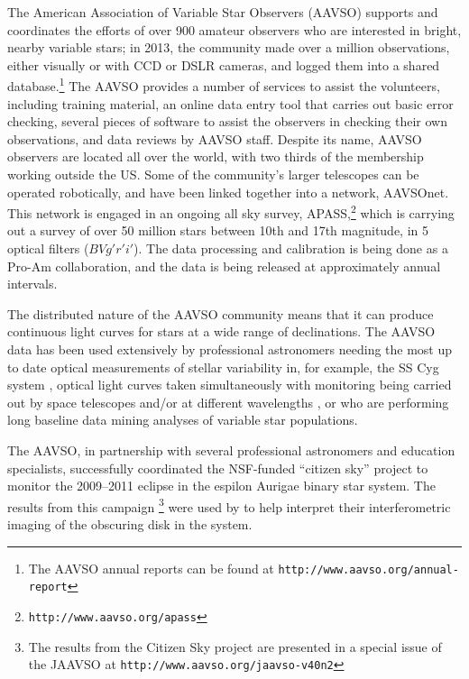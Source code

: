 \documentclass{ar2e}
\def\eg{{\it e.g.}\xspace}
\def\CaseStudy#1{\noindent{\it\bf #1 \,\,\,\,}}
\def\url#1{\texttt{#1}}
\begin{document}
\CaseStudy{Variable Star Monitoring: the AAVSO.}
The American Association of Variable Star Observers (AAVSO) supports and
coordinates the efforts of over 900 amateur observers who are interested in
bright, nearby variable stars; in 2013, the community made over a million
observations, either visually or with CCD or DSLR cameras, and logged them
into a shared database.\footnote{The AAVSO annual reports can be found at
\url{http://www.aavso.org/annual-report}} The AAVSO provides a number of
services to assist the volunteers, including training material, an online data
entry tool that carries out basic error checking, several pieces of
software to assist the observers in checking their own observations, and data
reviews by AAVSO staff. Despite its name, AAVSO observers are located all over
the world, with two thirds of the membership working outside the US. Some of
the community's larger telescopes can be operated robotically, and have been
linked together into a network, AAVSOnet. This network is engaged in an
ongoing all sky survey, APASS,\footnote{\url{http://www.aavso.org/apass}}
which is carrying out a survey of over 50 million stars between 10th and 17th
magnitude, in 5 optical filters ($BVg'r'i'$). The data processing and
calibration is being done as a Pro-Am collaboration, and the data is being
released at approximately annual intervals.

The distributed nature of the AAVSO community means that it can produce
continuous light curves for stars at a wide range of declinations. The AAVSO
data has been used extensively by professional astronomers needing the most 
up to date optical measurements of stellar variability in, for example, the 
SS Cyg system \citep{Miller-Jones++2013},  optical light curves taken
simultaneously with monitoring being carried out by space telescopes and/or at
different wavelengths \citep[see \eg][for a successful joint AAVSO--HST
program]{Szkody++2013},  or who are performing long baseline data mining
analyses of variable star populations. 

The AAVSO, in partnership with several professional astronomers and education
specialists, successfully coordinated the NSF-funded ``citizen sky'' project
to monitor the 2009--2011 eclipse in the espilon Aurigae binary star system.
The results from this campaign  \citep{Stencel2012}\footnote{The results from
the Citizen Sky project are presented in a special issue of the JAAVSO at 
\url{http://www.aavso.org/jaavso-v40n2}} were used by \citet{Kloppenborg++2010}
to help interpret their interferometric imaging of the obscuring disk in the
system.
\end{document}
